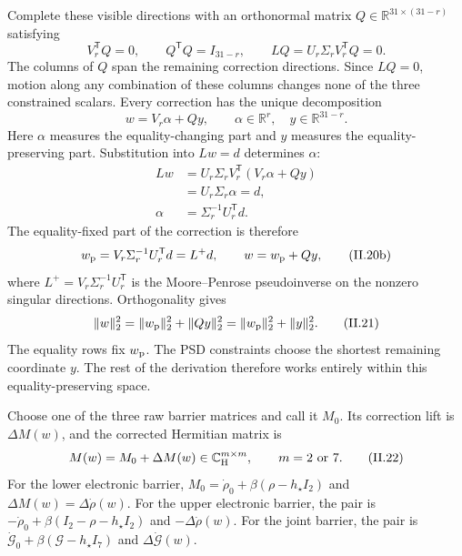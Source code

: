 \documentclass[10pt,letterpaper,twocolumn]{article}
\newcommand{\R}{\mathbb R}
\newcommand{\C}{\mathbb C}
\begin{document}
Complete these visible directions with an orthonormal matrix
\(Q\in\R^{31\times(31-r)}\) satisfying
\[
V_r^{\mathsf T}Q=0,
\qquad
Q^{\mathsf T}Q=I_{31-r},
\qquad
LQ=U_r\Sigma_rV_r^{\mathsf T}Q=0.
\tag{II.19}
\]
The columns of \(Q\) span the remaining correction directions.  Since
\(LQ=0\), motion along any combination of these columns changes none of the
three constrained scalars.  Every correction has the unique decomposition
\[
w=V_r\alpha+Qy,
\qquad
\alpha\in\R^r,\quad y\in\R^{31-r}.
\tag{II.20}
\]
Here \(\alpha\) measures the equality-changing part and \(y\) measures the
equality-preserving part.  Substitution into \(Lw=d\) determines \(\alpha\):
\[
\begin{aligned}
Lw
&=U_r\Sigma_rV_r^{\mathsf T}(V_r\alpha+Qy)\\
&=U_r\Sigma_r\alpha=d,\\
\alpha&=\Sigma_r^{-1}U_r^{\mathsf T}d.
\end{aligned}
\tag{II.20a}
\]
The equality-fixed part of the correction is therefore
\[
w_{\rm p}
=V_r\Sigma_r^{-1}U_r^{\mathsf T}d
=L^+d,
\qquad
w=w_{\rm p}+Qy,
\tag{II.20b}
\]
where \(L^+=V_r\Sigma_r^{-1}U_r^{\mathsf T}\) is the Moore--Penrose
pseudoinverse on the nonzero singular directions.  Orthogonality gives
\[
\lVert w\rVert_2^2
=\lVert w_{\rm p}\rVert_2^2+
\lVert Qy\rVert_2^2
=\lVert w_{\rm p}\rVert_2^2+
\lVert y\rVert_2^2.
\tag{II.21}
\]
The equality rows fix \(w_{\rm p}\).  The PSD constraints choose the shortest
remaining coordinate \(y\).  The rest of the derivation therefore works
entirely within this equality-preserving space.

Choose one of the three raw barrier matrices and call it \(M_0\).  Its
correction lift is \(\Delta M(w)\), and the corrected Hermitian matrix is
\[
M(w)=M_0+\Delta M(w)\in\C_{\rm H}^{m\times m},
\qquad m=2\ \text{or}\ 7.
\tag{II.22}
\]
For the lower electronic barrier,
\(M_0=\dot\rho_0+\beta(\rho-h_\star I_2)\) and
\(\Delta M(w)=\Delta\dot\rho(w)\).  For the upper electronic barrier, the
pair is \(-\dot\rho_0+\beta(I_2-\rho-h_\star I_2)\) and
\(-\Delta\dot\rho(w)\).  For the joint barrier, the pair is
\(\dot{\mathcal G}_0+\beta(\mathcal G-h_\star I_7)\) and
\(\Delta\dot{\mathcal G}(w)\).
\end{document}
